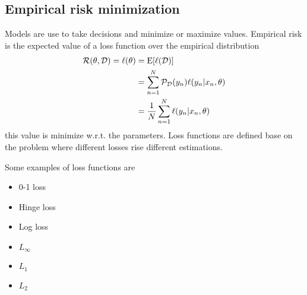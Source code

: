 \documentclass[../../main.tex]{subfiles}
\begin{document}
\subsection{Empirical risk minimization}
Models are use to take decisions and minimize or maximize values. Empirical risk is the expected value of a loss function over the empirical distribution
\begin{align*}
    \mathcal{R}(\theta,\mathcal{D})=\ell(\theta) &= \mathrm{E}[\ell(\mathcal{D})]\\
    &=\sum_{n=1}^N \mathcal{P}_{\mathcal{D}}(y_n)\ell(y_n|x_n,\theta)\\
    &=\frac{1}{N} \sum_{n=1}^N \ell(y_n|x_n,\theta)\\
\end{align*}
this value is minimize w.r.t. the parameters. Loss functions are defined base on the problem where different losses rise different estimations.

Some examples of loss functions are
\begin{itemize}
    \item 0-1 loss
    \item Hinge loss
    \item Log loss
    \item $L_\infty$
    \item $L_1$
    \item $L_2$
\end{itemize}
\end{document}
